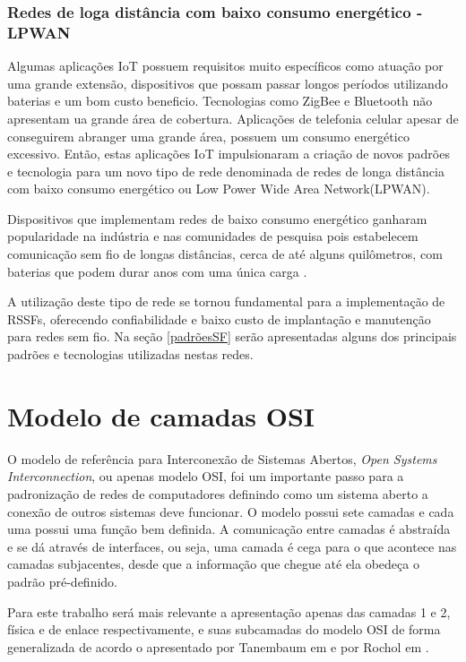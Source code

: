 \subsubsection*{Redes de loga distância com baixo consumo energético - LPWAN}
Algumas aplicações IoT possuem requisitos muito específicos como atuação por uma grande extensão, dispositivos que possam passar longos períodos utilizando baterias e um bom custo beneficio. Tecnologias como ZigBee e Bluetooth não apresentam ua grande área de cobertura. Aplicações de telefonia celular apesar de conseguirem abranger uma grande área, possuem um consumo energético excessivo. Então, estas aplicações IoT impulsionaram a criação de novos padrões e tecnologia para um novo tipo de rede denominada de redes de longa distância com baixo consumo energético ou Low Power Wide Area Network(LPWAN).

Dispositivos que implementam redes de baixo consumo energético ganharam popularidade na indústria e nas comunidades de pesquisa pois estabelecem comunicação sem fio de longas distâncias, cerca de até alguns quilômetros, com baterias que podem durar anos com uma única carga \cite{mekki2019comparative}.

A utilização deste tipo de rede se tornou fundamental para a implementação de RSSFs, oferecendo confiabilidade e baixo custo de implantação e manutenção para redes sem fio. Na seção \ref{padrõesSF} serão apresentadas alguns dos principais padrões e tecnologias utilizadas nestas redes.

\section{Modelo de camadas OSI}
\label{osi}
O modelo de referência para Interconexão de Sistemas Abertos, \emph{Open Systems Interconnection}, ou apenas modelo OSI, foi um importante passo para a padronização de redes de computadores definindo como um sistema aberto a conexão de outros sistemas deve funcionar. O modelo possui sete camadas e cada uma possui uma função bem definida. A comunicação entre camadas é abstraída e se dá através de interfaces, ou seja, uma camada é cega para o que acontece nas camadas subjacentes, desde que a informação que chegue até ela obedeça o padrão pré-definido.


Para este trabalho será mais relevante a apresentação apenas das camadas 1 e 2, física e de enlace respectivamente, e suas subcamadas do modelo OSI de forma generalizada de acordo o apresentado por Tanembaum em \cite{tanembaum2011} e por Rochol em \cite{rochol2018sistemas}.

